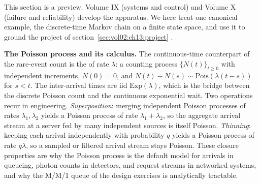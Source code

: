 This section is a preview. Volume IX (systems and control) and
Volume X (failure and reliability) develop the apparatus. We here
treat one canonical example, the discrete-time Markov chain on a
finite state space, and use it to ground the project of
section~\ref{sec:vol02:ch13:project}
\cite[ch.~6]{text:wasserman2004,text:v2ch13-norris-markov}.

\begin{mastery}
\textbf{The Poisson process and its calculus.} The continuous-time
counterpart of the rare-event count is the  of rate $\lambda$: a counting process $\{N(t)\}_{t \geq 0}$
with independent increments, $N(0) = 0$, and $N(t) - N(s) \sim
\mathrm{Pois}(\lambda(t - s))$ for $s < t$. The inter-arrival times
are iid $\mathrm{Exp}(\lambda)$, which is the bridge between the
discrete Poisson count and the continuous exponential wait. Two
operations recur in engineering. \emph{Superposition}: merging
independent Poisson processes of rates $\lambda_{1}, \lambda_{2}$
yields a Poisson process of rate $\lambda_{1} + \lambda_{2}$, so the
aggregate arrival stream at a server fed by many independent sources
is itself Poisson. \emph{Thinning}: keeping each arrival
independently with probability $q$ yields a Poisson process of rate
$q\lambda$, so a sampled or filtered arrival stream stays Poisson.
These closure properties are why the Poisson process is the default
model for arrivals in queueing, photon counts in detectors, and
request streams in networked systems, and why the M/M/1 queue of the
design exercises is analytically tractable.
\end{mastery}

